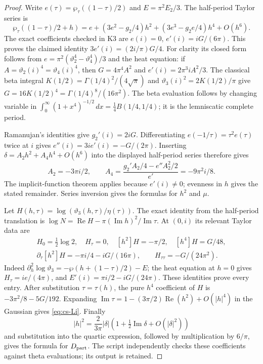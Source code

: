 \begin{proof}
Write $e(\tau)=\wp_\tau((1-\tau)/2)$ and
$E=\pi^2E_2/3$. The half-period Taylor series is
\[
 \wp_\tau((1-\tau)/2+h)
 =e+(3e^2-g_2/4)h^2+(3e^3-g_2e/4)h^4+O(h^6).
\]
The exact coefficients checked in K3 are
$e(i)=0$, $e'(i)=iG/(6\pi)$. This proves the claimed identity
$3e'(i)=(2i/\pi)G/4$. For clarity its closed form follows from
$e=\pi^2(\vartheta_2^4-\vartheta_4^4)/3$ and the heat equation:
if $A=\vartheta_2(i)^4=\vartheta_4(i)^4$, then
$G=4\pi^4A^2$ and $e'(i)=2\pi^3iA^2/3$.
The classical beta integral
$K(1/2)=\Gamma(1/4)^2/(4\sqrt\pi)$ and
$\vartheta_3(i)^2=2K(1/2)/\pi$ give
$G=16K(1/2)^4=\Gamma(1/4)^8/(16\pi^2)$.
The beta evaluation follows by changing variable in
$\int_0^\infty(1+x^4)^{-1/2}\,dx
=\tfrac14 B(1/4,1/4)$; it is the lemniscatic complete period.

Ramanujan's identities give $g_2'(i)=2iG$. Differentiating
$e(-1/\tau)=\tau^2 e(\tau)$ twice at $i$ gives
$e''(i)=3i e'(i)=-G/(2\pi)$. Inserting
$\delta=A_2h^2+A_4h^4+O(h^6)$ into the displayed half-period series
therefore gives
\[
 A_2=-3\pi i/2,\qquad
 A_4=\frac{g_2'A_2/4-e''A_2^2/2}{e'}=-9\pi^2i/8.
\]
The implicit-function theorem applies because $e'(i)\ne0$;
evenness in $h$ gives the stated remainder. Series inversion gives
the formulas for $h^2$ and $\mu$.

Let $H(h,\tau)=\log(\vartheta_3(h,\tau)/\eta(\tau))$. The exact
identity from the half-period translation is
$\log N=\operatorname{Re}H-\pi(\operatorname{Im}h)^2/
\operatorname{Im}\tau$. At $(0,i)$ its relevant Taylor data are
\[
 \begin{gathered}
 H_0=\tfrac12\log2,\quad H_\tau=0,\quad
 [h^2]H=-\pi/2,\quad [h^4]H=G/48,\\
 \partial_\tau[h^2]H=-\pi i/4-iG/(16\pi),\qquad
 H_{\tau\tau}=-G/(24\pi^2).
 \end{gathered}
\]
Indeed $\partial_h^2\log\vartheta_3=-\wp(h+(1-\tau)/2)-E$;
the heat equation at $h=0$ gives $H_\tau=ie/(4\pi)$, and
$E'(i)=\pi i/2-iG/(24\pi)$. These identities prove every entry.
After substitution $\tau=\tau(h)$, the pure $h^4$ coefficient of
$H$ is $-3\pi^2/8-5G/192$. Expanding
$\operatorname{Im}\tau=1-(3\pi/2)\operatorname{Re}(h^2)+O(|h|^4)$
in the Gaussian gives \eqref{eq:cs-Li}. Finally
\[
 |h|^2=\frac{2}{3\pi}|\delta|
          \left(1+\tfrac12\operatorname{Im}\delta+O(|\delta|^2)\right)
\]
and substitution into the quartic expression, followed by
multiplication by $6/\pi$, gives the formula for $D_{\rm part}$.
The script  independently checks
these coefficients against theta evaluations; its output is retained.
\end{proof}

